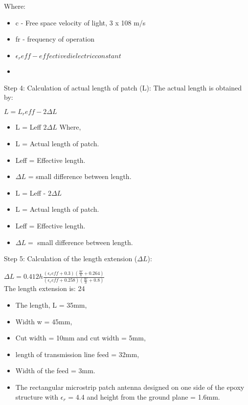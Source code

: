 		\justify
         Where:         
          \begin{itemize}
          	\item   c - Free space velocity of light, 3 x 108 m/s
          	\item fr - frequency of operation
          	\item $\epsilon_reff - effective dielectric constant $
          \end{itemize}
         \begin{itemize}
         	\item 
         \end{itemize}
        
		\justify
         Step 4: Calculation of actual length of patch (L):
        \justify 
         The actual length is obtained by:
	         
	         \centering
	          $ L = L_reff -2 \Delta L $
         
         
         \begin{itemize}
           	\item  L = Leff $ 2 \Delta L $
           	Where,
           	\item L 	= Actual length of patch.
           	\item Leff 	 = Effective length.
           	\item $ \Delta L $ 	= small difference between length.
			\item  L = Leff -  $ 2 \Delta L $
			\item  L 	= Actual length of patch.
			\item  Leff 	 = Effective length.
			\item $ \Delta L  = $ small difference between length.
         \end{itemize}
         
		\justify
         Step 5: Calculation of the length extension ($ \Delta L $):
         
		         \centering 
			         $ \Delta L = 0.412 h \frac{(\epsilon_reff + 0.3)(\frac{W}{h} + 0.264)}{(\epsilon_reff + 0.258)(\frac{W}{h} + 0.8)}$ \\
		\justify
		The length extension is: 24

		\begin{itemize}
			\item  The length, L = 35mm,
			\item Width w = 45mm,
			\item Cut width = 10mm
			and cut width = 5mm,
			\item length of transmission line feed = 32mm,
			\item Width of the feed = 3mm.
			\item The rectangular microstrip patch antenna designed on one side of the epoxy structure with $ \epsilon_r $ = 4.4 and height from the ground plane = 1.6mm. \\
		\end{itemize}
        



